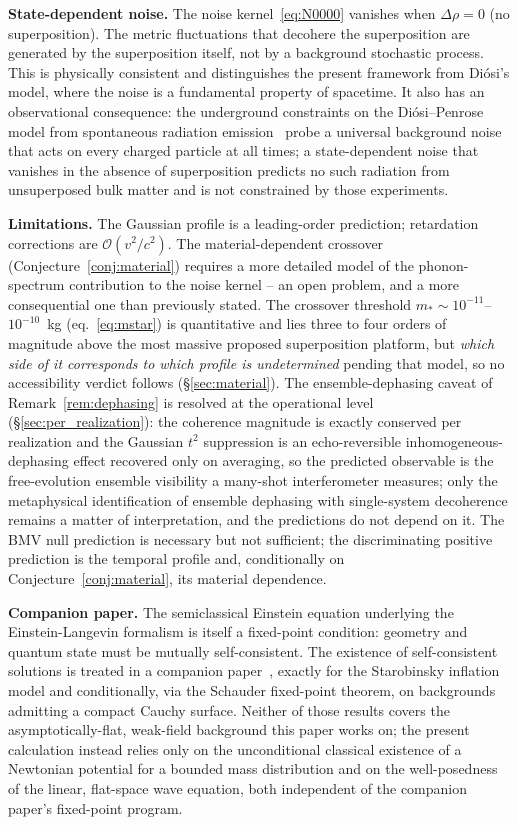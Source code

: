 \documentclass[12pt,a4paper]{article}
\theoremstyle{remark}
\begin{document}
\textbf{State-dependent noise.} The noise kernel~\eqref{eq:N0000} vanishes when
$\Delta\rho = 0$ (no superposition). The metric fluctuations that decohere the
superposition are generated by the superposition itself, not by a background stochastic
process. This is physically consistent and distinguishes the present framework
from Di\'osi's model, where the noise is a fundamental property of spacetime. It also has
an observational consequence: the underground constraints on the Di\'osi--Penrose model
from spontaneous radiation emission~\cite{donadi} probe a universal background noise that
acts on every charged particle at all times; a state-dependent noise that vanishes in the
absence of superposition predicts no such radiation from unsuperposed bulk matter and is
not constrained by those experiments.

\textbf{Limitations.} The Gaussian profile is a leading-order prediction; retardation
corrections are $\mathcal{O}(v^2/c^2)$. The material-dependent crossover
(Conjecture~\ref{conj:material}) requires a more detailed model of the phonon-spectrum
contribution to the noise kernel -- an open problem, and a more consequential one than
previously stated. The crossover threshold $m_\ast\sim10^{-11}$--$10^{-10}$~kg
(eq.~\eqref{eq:mstar}) is quantitative and lies three to four orders of magnitude above
the most massive proposed superposition platform, but \emph{which side of it corresponds
to which profile is undetermined} pending that model, so no accessibility verdict follows
(\S\ref{sec:material}).
The ensemble-dephasing caveat of Remark~\ref{rem:dephasing} is resolved at the operational
level (\S\ref{sec:per_realization}): the coherence magnitude is exactly conserved per
realization and the Gaussian $t^2$ suppression is an echo-reversible inhomogeneous-dephasing
effect recovered only on averaging, so the predicted observable is the free-evolution
ensemble visibility a many-shot interferometer measures; only the metaphysical
identification of ensemble dephasing with single-system decoherence remains a matter of
interpretation, and the predictions do not depend on it. The BMV null
prediction is necessary but not sufficient; the discriminating positive prediction is the
temporal profile and, conditionally on Conjecture~\ref{conj:material}, its material
dependence.

\textbf{Companion paper.} The semiclassical Einstein equation underlying the
Einstein-Langevin formalism is itself a fixed-point condition: geometry and quantum state
must be mutually self-consistent. The existence of self-consistent solutions is treated in a
companion paper~\cite{fixed_point}, exactly for the Starobinsky inflation model and
conditionally, via the Schauder fixed-point theorem, on backgrounds admitting a compact
Cauchy surface. Neither of those results covers the asymptotically-flat, weak-field
background this paper works on; the present calculation instead relies only on the
unconditional classical existence of a Newtonian potential for a bounded mass distribution
and on the well-posedness of the linear, flat-space wave equation, both independent of the
companion paper's fixed-point program.
\end{document}
